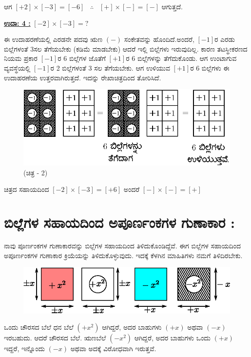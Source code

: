 ಆಗ $[+2]\times [-3]=[-6]$ \ $\therefore$ \ $[+]\times [-]=[-]$ ಆಗುತ್ತದೆ.

\noindent
{\textbf{\underline{ಉದಾ: 4 :}}} $[-2] \times [-3] = ?$

ಈ ಉದಾಹರಣೆಯಲ್ಲಿ ಎರಡನೇ ಪದವು ಋಣ $(-)$ ಸಂಕೇತವನ್ನು ಹೊಂದಿದೆ.\break ಅಂದರೆ, $[-1]$ರ ಎರಡು ಬಿಲ್ಲೆಗಳಂತೆ 3ಸಲ ತೆಗೆಯಬೇಕು (ಕಡಿಮೆ ಮಾಡಬೇಕು) ಆದರೆ ಇಲ್ಲಿ ಬಿಲ್ಲೆಗಳು ಇರುವುದಿಲ್ಲ. ಕಾರಣ ತಟಸ್ಥೀಕರಣದ ನಿಯಮ ಪ್ರಕಾರ $[-1]$ರ 6 ಬಿಲ್ಲೆಗಳ ಜೊತೆಗೆ $[+1]$ರ 6 ಬಿಲ್ಲೆಗಳನ್ನು ತೆಗೆದುಕೊಂಡು. ಆಗ ಉಂಟಾಗುವ ವ್ಯವಸ್ಥೆಯಲ್ಲಿ $[-1]$ರ 2 ಬಿಲ್ಲೆಗಳಂತೆ 3 ಸಲ ತೆಗೆಯಬೇಕು. ಆಗ ಉಳಿಯುವ $[+1]$ರ 6 ಬಿಲ್ಲೆಗಳು ಈ ಉದಾ\break ಹರಣೆಯ ಉತ್ತರವಾಗಿರುತ್ತದೆ. ಇದನ್ನು ರೇಖಾಚಿತ್ರದಿಂದ ತೋರಿಸಿದೆ.

\begin{figure}[H]
\centering
\includegraphics[scale=0.8]{src/figure/chap3/fig3-21b.eps}
(ಚಿತ್ರ - 2)
\end{figure}

ಚಿತ್ರದ ಸಹಾಯದಿಂದ $[-2]\times [-3]=[+6]$ ಅಂದರೆ $[-]\times [-]=[+]$

\section*{ಬಿಲ್ಲೆಗಳ ಸಹಾಯದಿಂದ ಅಪೂರ್ಣಂಕಗಳ ಗುಣಾಕಾರ :}

ನಾವು ಪೂರ್ಣಂಕಗಳ ಗುಣಾಕಾರವನ್ನು ಬಿಲ್ಲೆಗಳ ಸಹಾಯದಿಂದ ತಿಳಿದುಕೊಂಡಿದ್ದೆವೆ. ಈಗ ಬಿಲ್ಲೆಗಳ ಸಹಾಯದಿಂದ ಅಪೂರ್ಣಂಕಗಳ ಗುಣಾಕಾರ ಕ್ರಿಯೆಯನ್ನು ತಿಳಿದುಕೊಳ್ಳುವುದು. ಇದಕ್ಕೆ ಕೆಳಗಿನ ಮಾಹಿತಿಗಳು ನಮಗೆ ತಿಳಿದಿರಬೇಕು.
\begin{figure}[H]
\centering
\includegraphics[scale=0.8]{src/figure/chap3/fig3-22.eps}
\end{figure}
ಒಂದು ಚೌರಸದ ಬೆಲೆ ಧನ ಬೆಲೆ $(+x^2)$ ಆಗಿದ್ದರೆ, ಅದರ ಬಾಹುಗಳು $(+x)$ ಅಥವಾ $(-x)$ ಇರಬಹುದು. ಆದರೆ ಚೌರಸದ ಬೆಲೆ. ಋಣಬೆಲೆ $(-x^2)$ ಆಗಿದ್ದರೆ, ಅದರ ಬಾಹುಗಳು ಒಂದು $(+x)$ ಇದ್ದರೆ, ಇನ್ನೊಂದು $(-x)$ ಅಥವಾ ಅದಕ್ಕೆ ವಿರೋಧವಾಗಿ ಇರುತ್ತವೆ.

